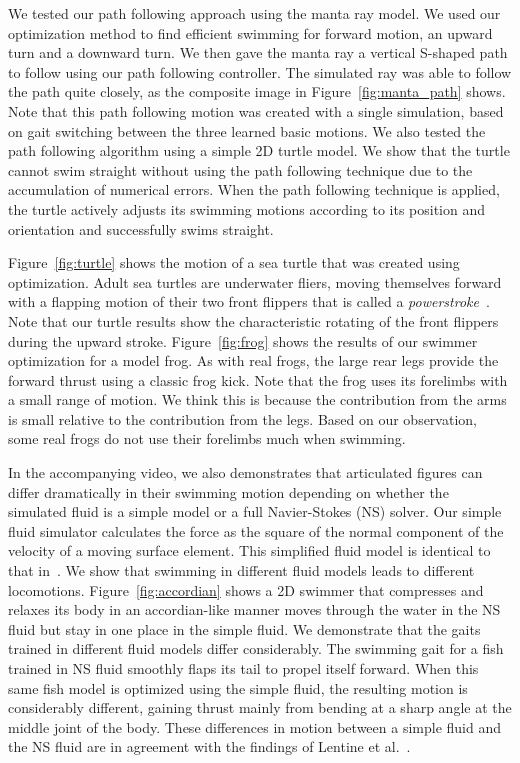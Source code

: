 We tested our path following approach using the manta ray model.  We used
our optimization method to find efficient swimming for forward motion, an
upward turn and a downward turn.  We then gave the manta ray a vertical
S-shaped path to follow using our path following controller.  The
simulated ray was able to follow the path quite closely, as the composite
image in Figure~\ref{fig:manta_path} shows.  Note that this path following
motion was created with a single simulation, based on gait switching
between the three learned basic motions. We also tested the path following
algorithm using a simple 2D turtle model. We show that the turtle cannot
swim straight without using the path following technique due to the
accumulation of numerical errors. When the path following technique is
applied, the turtle actively adjusts its swimming motions according to its
position and orientation and successfully swims straight.

Figure~\ref{fig:turtle} shows the motion of a sea turtle that was created
using optimization.  Adult sea turtles are underwater fliers, moving
themselves forward with a flapping motion of their two front flippers that
is called a \emph{powerstroke}~\cite{wyneken1997}.  Note that our turtle
results show the characteristic rotating of the front flippers during the
upward stroke.  Figure~\ref{fig:frog} shows the results of our swimmer
optimization for a model frog.  As with real frogs, the large rear legs
provide the forward thrust using a classic frog kick. Note that the frog uses its forelimbs with a small range of motion. We think this is because the contribution from the arms is small relative to the contribution from the legs. Based on our observation, some real frogs do not use their forelimbs much when swimming.

In the accompanying video, we also demonstrates that articulated figures
can differ dramatically in their swimming motion depending on whether the
simulated fluid is a simple model or a full Navier-Stokes (NS) solver.
Our simple fluid simulator calculates the force as the square of the
normal component of the velocity of a moving surface element.  This
simplified fluid model is identical to that
in~\cite{wu2003realistic,lentine2010creature}.  We show that swimming in
different fluid models leads to different locomotions. Figure~\ref{fig:accordian} shows a 2D swimmer that
compresses and relaxes its body in an accordian-like manner moves through
the water in the NS fluid but stay in one place in the simple fluid. We
demonstrate that the gaits trained in different fluid models differ
considerably.  The swimming gait for a fish trained in NS fluid smoothly
flaps its tail to propel itself forward.  When this same fish model is
optimized using the simple fluid, the resulting motion is considerably
different, gaining thrust mainly from bending at a sharp angle at the
middle joint of the body.  These differences in motion between a simple
fluid and the NS fluid are in agreement with the findings of Lentine et
al.~\cite{lentine2010creature}.

